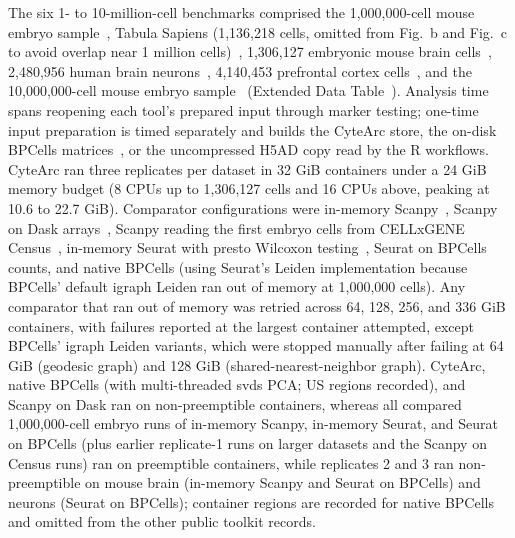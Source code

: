 \label{note:Benchmark datasets and comparator runs}

The six 1- to 10-million-cell benchmarks comprised the 1,000,000-cell mouse embryo sample~\cite{qiu2024}, Tabula Sapiens (1,136,218 cells, omitted from Fig.~b and Fig.~c to avoid overlap near 1 million cells)~\cite{tabulasapiens2022,tabulasapiens2024}, 1,306,127 embryonic mouse brain cells~\cite{tenx2017brain}, 2,480,956 human brain neurons~\cite{siletti2023}, 4,140,453 prefrontal cortex cells~\cite{lee2026singlecell}, and the 10,000,000-cell mouse embryo sample~\cite{qiu2024} (Extended Data Table~). Analysis time spans reopening each tool's prepared input through marker testing; one-time input preparation is timed separately and builds the CyteArc store, the on-disk BPCells matrices~\cite{parks2025bpcells}, or the uncompressed H5AD copy read by the R workflows. CyteArc ran three replicates per dataset in 32 GiB containers under a 24 GiB memory budget (8 CPUs up to 1,306,127 cells and 16 CPUs above, peaking at 10.6 to 22.7 GiB). Comparator configurations were in-memory Scanpy~\cite{wolf2018}, Scanpy on Dask arrays~\cite{scanpydask}, Scanpy reading the first embryo cells from CELLxGENE Census~\cite{cellxgene2025}, in-memory Seurat with presto Wilcoxon testing~\cite{hao2024seurat,korsunsky2019presto}, Seurat on BPCells counts, and native BPCells (using Seurat's Leiden implementation because BPCells' default igraph Leiden ran out of memory at 1,000,000 cells). Any comparator that ran out of memory was retried across 64, 128, 256, and 336 GiB containers, with failures reported at the largest container attempted, except BPCells' igraph Leiden variants, which were stopped manually after failing at 64 GiB (geodesic graph) and 128 GiB (shared-nearest-neighbor graph). CyteArc, native BPCells (with multi-threaded svds PCA; US regions recorded), and Scanpy on Dask ran on non-preemptible containers, whereas all compared 1,000,000-cell embryo runs of in-memory Scanpy, in-memory Seurat, and Seurat on BPCells (plus earlier replicate-1 runs on larger datasets and the Scanpy on Census runs) ran on preemptible containers, while replicates 2 and 3 ran non-preemptible on mouse brain (in-memory Scanpy and Seurat on BPCells) and neurons (Seurat on BPCells); container regions are recorded for native BPCells and omitted from the other public toolkit records.

